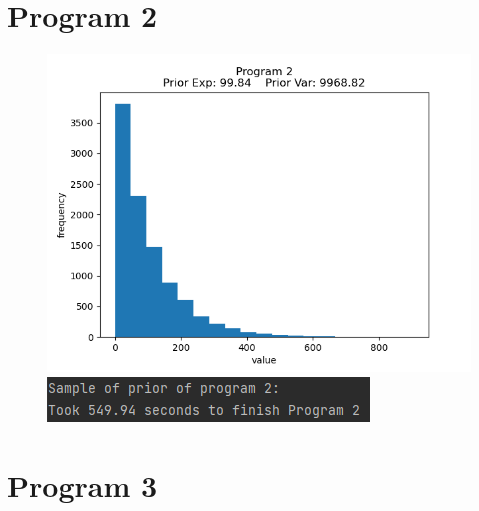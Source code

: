 \documentclass[10pt]{homeworg}
\begin{document}
\newpage

\section*{Program 2}

\begin{figure}[!htbp]
    \centering
    \begin{minipage}{0.45\textwidth}
        \centering
       \includegraphics[scale=0.5]{../figures/program1.png}
    \end{minipage}\hfill
    \begin{minipage}{0.45\textwidth}
        \centering
        \includegraphics[scale=0.8]{../figures/program1_time.png}
    \end{minipage}
\end{figure}

\newpage

\section*{Program 3}
\end{document}
